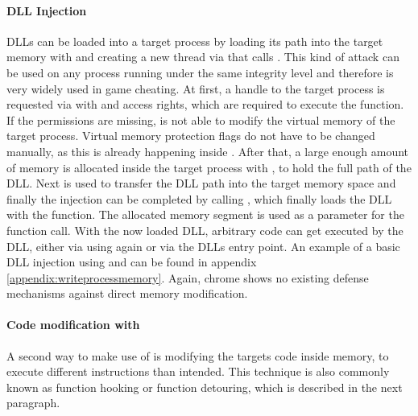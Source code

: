 \paragraph{ DLL Injection}
DLLs can be loaded into a target process by loading its path into the target memory with  and creating a new thread via  that calls . This kind of attack can be used on any process running under the same integrity level and therefore is very widely used in game cheating. At first, a handle to the target process is requested via  with  and  access rights, which are required to execute the  function. If the permissions are missing,  is not able to modify the virtual memory of the target process. Virtual memory protection flags do not have to be changed manually, as this is already happening inside . After that, a large enough amount of memory is allocated inside the target process with , to hold the full path of the DLL. Next  is used to transfer the DLL path into the target memory space and finally the injection can be completed by calling , which finally loads the DLL with the  function. The allocated memory segment is used as a parameter for the  function call. With the now loaded DLL, arbitrary code can get executed by the DLL, either via using  again or via the DLLs entry point.
An example of a basic DLL injection using  and  can be found in appendix \ref{appendix:writeprocessmemory}. Again, chrome shows no existing defense mechanisms against direct memory modification.

\paragraph{Code modification with }
A second way to make use of  is modifying the targets code inside memory, to execute different instructions than intended. This technique is also commonly known as function hooking or function detouring, which is described in the next paragraph. 

